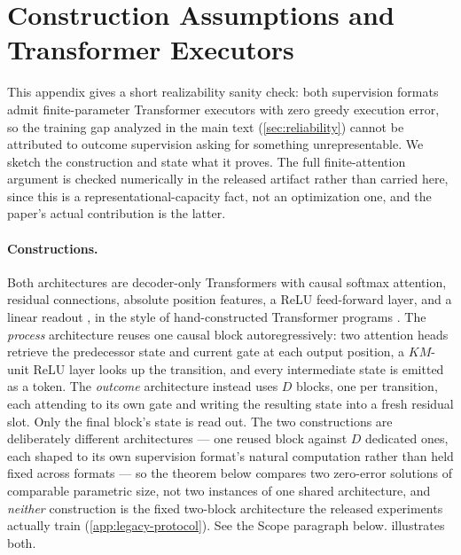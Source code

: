
\section{Construction Assumptions and Transformer Executors}
\label{app:architectures}

This appendix gives a short realizability sanity check: both supervision
formats admit finite-parameter Transformer executors with zero greedy
execution error, so the training gap analyzed in the main text
(\cref{sec:reliability}) cannot be attributed to outcome supervision asking
for something unrepresentable. We sketch the construction and state what it
proves. The full finite-attention argument is checked numerically in the
released artifact rather than carried here, since this is a
representational-capacity fact, not an optimization one, and the paper's
actual contribution is the latter.

\paragraph{Constructions.} Both architectures are decoder-only Transformers
with causal softmax attention, residual connections, absolute position
features, a ReLU feed-forward layer, and a linear readout
\citep{vaswani2017attention}, in the style of hand-constructed Transformer
programs \citep{weiss2021thinking,liu2023automata,makkuva2025attentionmarkov}.
The \emph{process} architecture reuses one causal block autoregressively:
two attention heads retrieve the predecessor state and current gate at each
output position, a $KM$-unit ReLU layer looks up the transition, and every
intermediate state is emitted as a token. The \emph{outcome} architecture
instead uses $D$ blocks, one per transition, each attending to its own gate
and writing the resulting state into a fresh residual slot. Only the final
block's state is read out. The two constructions are deliberately different
architectures --- one reused block against $D$ dedicated ones, each shaped
to its own supervision format's natural computation rather than held fixed
across formats --- so the theorem below compares two zero-error solutions
of comparable parametric size, not two instances of one shared architecture,
and \emph{neither} construction is the fixed two-block architecture the
released experiments actually train (\cref{app:legacy-protocol}). See the
Scope paragraph below.  illustrates both.

